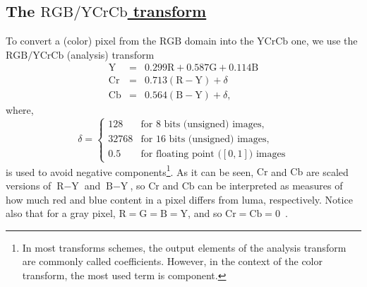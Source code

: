 \subsection{The \href{https://en.wikipedia.org/wiki/YCbCr}{$\text{RGB/YCrCb}$ transform}}
To convert a (color) pixel from the $\text{RGB}$ domain into the
$\text{YCrCb}$ one, we use the $\text{RGB/YCrCb}$ (analysis)
transform~\cite{malvar2008lifting}
\begin{equation}
  \begin{array}{lcl}
    \text{Y}  & = & 0.299\text{R} + 0.587\text{G} + 0.114\text{B} \\
    \text{Cr} & = & 0.713(\text{R} - \text{Y}) + \delta \\
    \text{Cb} & = & 0.564(\text{B} - \text{Y}) + \delta,
  \end{array}
  \label{eq:alternative_YCrCb}
\end{equation}
where,
\begin{equation}
  \delta = \left\{
  \begin{array}{ll}
    128 & \text{for 8 bits (unsigned) images},\\
    32768 & \text{for 16 bits (unsigned) images},\\
    0.5 & \text{for floating point (}[0,1]\text{) images}
  \end{array}
  \right.
\end{equation}
is used to avoid negative components\footnote{In most transforms
schemes, the output elements of the analysis transform are commonly
called coefficients. However, in the context of the color transform,
the most used term is component.}. As it can be seen, $\text{Cr}$ and
$\text{Cb}$ are scaled versions of $\text{R} - \text{Y}$ and $\text{B}
- \text{Y}$, so $\text{Cr}$ and $\text{Cb}$ can be interpreted as
measures of how much red and blue content in a pixel differs from
luma, respectively. Notice also that for a gray pixel,
$\text{R}=\text{G}=\text{B}=\text{Y}$, and so
$\text{Cr}=\text{Cb}=0$~\cite{malvar2008lifting}.
